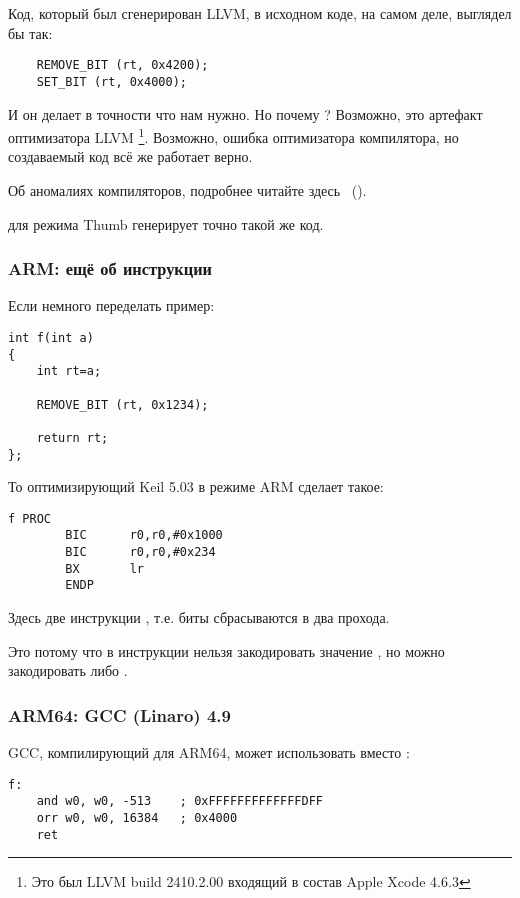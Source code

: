 Код, который был сгенерирован LLVM, в исходном коде, на самом деле, выглядел бы так:

\begin{lstlisting}
    REMOVE_BIT (rt, 0x4200);
    SET_BIT (rt, 0x4000);
\end{lstlisting}

И он делает в точности что нам нужно. 
Но почему ? 
Возможно, это артефакт оптимизатора LLVM
\footnote{Это был LLVM build 2410.2.00 входящий в состав Apple Xcode 4.6.3}.
Возможно, ошибка оптимизатора компилятора, но создаваемый код всё же работает верно.

Об аномалиях компиляторов, подробнее читайте здесь ~().

\OptimizingXcodeIV для режима Thumb генерирует точно такой же код.

\subsubsection{ARM: ещё об инструкции }

Если немного переделать пример:

\begin{lstlisting}
int f(int a)
{
    int rt=a;

    REMOVE_BIT (rt, 0x1234);

    return rt;
};
\end{lstlisting}

То оптимизирующий Keil 5.03 в режиме ARM сделает такое:

\begin{lstlisting}
f PROC
        BIC      r0,r0,#0x1000
        BIC      r0,r0,#0x234
        BX       lr
        ENDP
\end{lstlisting}

Здесь две инструкции , т.е. биты  сбрасываются в два прохода.

Это потому что в инструкции  нельзя закодировать значение , 
но можно закодировать  либо .

\subsubsection{ARM64: \Optimizing GCC (Linaro) 4.9}

\Optimizing GCC, компилирующий для ARM64, может использовать \AND вместо :

\begin{lstlisting}[caption=\Optimizing GCC (Linaro) 4.9]
f:
	and	w0, w0, -513	; 0xFFFFFFFFFFFFFDFF
	orr	w0, w0, 16384	; 0x4000
	ret
\end{lstlisting}

